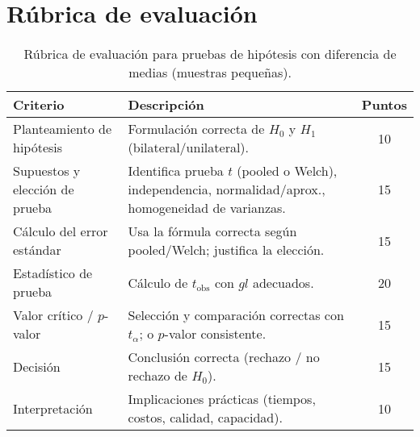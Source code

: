 
\section{Rúbrica de evaluación}


\begin{table}[H]
  \centering
  \begin{tabular}{p{} p{} c}
  \toprule
  \textbf{Criterio} & \textbf{Descripción} & \textbf{Puntos}\\
  \midrule
  Planteamiento de hipótesis & Formulación correcta de $H_0$ y $H_1$ (bilateral/unilateral). & 10\\
  Supuestos y elección de prueba & Identifica prueba $t$ (pooled o Welch), independencia, normalidad/aprox., homogeneidad de varianzas. & 15\\
  Cálculo del error estándar & Usa la fórmula correcta según pooled/Welch; justifica la elección. & 15\\
  Estadístico de prueba & Cálculo de $t_{\text{obs}}$ con $gl$ adecuados. & 20\\
  Valor crítico / $p$-valor & Selección y comparación correctas con $t_{\alpha}$; o $p$-valor consistente. & 15\\
  Decisión & Conclusión correcta (rechazo / no rechazo de $H_0$). & 15\\
  Interpretación & Implicaciones prácticas (tiempos, costos, calidad, capacidad). & 10\\
  \bottomrule
  \end{tabular}
  \caption{Rúbrica de evaluación para pruebas de hipótesis con diferencia de medias (muestras pequeñas).}
\end{table}